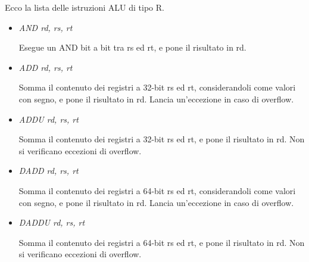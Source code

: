 \documentclass[letterpaper,10pt,italian]{sphinxmanual}
\begin{document}
Ecco la lista delle istruzioni ALU di tipo R.
\begin{itemize}
\item {} 
\emph{AND rd, rs, rt}

Esegue un AND bit a bit tra rs ed rt, e pone il risultato in rd.

\item {} 
\emph{ADD rd, rs, rt}

Somma il contenuto dei registri a 32-bit rs ed rt, considerandoli come
valori con segno, e pone il risultato in rd.  Lancia un'eccezione in caso di
overflow.

\item {} 
\emph{ADDU rd, rs, rt}

Somma il contenuto dei registri a 32-bit rs ed rt, e pone il risultato in
rd. Non si verificano eccezioni di overflow.

\end{itemize}
\begin{itemize}
\item {} 
\emph{DADD rd, rs, rt}

Somma il contenuto dei registri a 64-bit rs ed rt, considerandoli come
valori con segno, e pone il risultato in rd.  Lancia un'eccezione in caso di
overflow.

\item {} 
\emph{DADDU rd, rs, rt}

Somma il contenuto dei registri a 64-bit rs ed rt, e pone il risultato in rd.
Non si verificano eccezioni di overflow.

\end{itemize}
\end{document}
